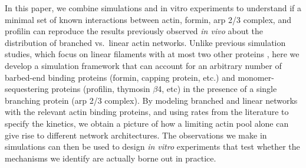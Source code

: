 \documentclass[11pt]{article}
\newcommand{\red}[1]{\color{red}#1\normalcolor}
\begin{document}


In this paper, we combine simulations and in vitro experiments to understand if a minimal set of known interactions between actin, formin, arp 2/3 complex, and profilin can reproduce the results previously observed \emph{in vivo} about the distribution of branched vs.\ linear actin networks. Unlike previous simulation studies, which focus on linear filaments with at most two other proteins \cite{fass2008stochastic, mcinally2021scaling, banerjee2022size, rosario2023universal, mcinally2023length}, here we develop a simulation framework that can account for an arbitrary number of barbed-end binding proteins (formin, capping protein, etc.) and monomer-sequestering proteins (profilin, thymosin $\beta$4, etc) in the presence of a single branching protein (arp 2/3 complex). By modeling branched and linear networks with the relevant actin binding proteins, and using rates from the literature to specify the kinetics, we obtain a picture of how a limiting actin pool alone can give rise to different network architectures. The observations we make in simulations can then be used to design \emph{in vitro} experiments that test whether the mechanisms we identify are actually borne out in practice. 
\end{document}

